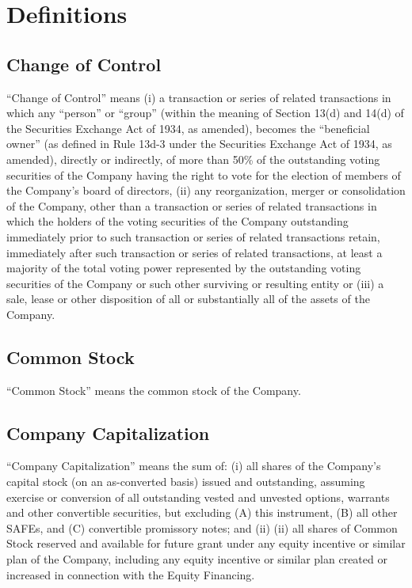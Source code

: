 \documentclass[12pt,letterpaper,fullpage]{article}
\begin{document}
\section{Definitions}
\label{sec:definitions}

\subsection{Change of Control}
\label{sec:changeofcontrol}

\begin{sloppypar}
“Change of Control” means (i) a transaction or series of related
transactions in which any “person” or “group” (within the meaning of
Section 13(d) and 14(d) of the Securities Exchange Act of 1934, as
amended), becomes the “beneficial owner” (as defined in Rule 13d-3
under the Securities Exchange Act of 1934, as amended), directly or
indirectly, of more than 50\% of the outstanding voting securities of
the Company having the right to vote for the election of members of
the Company’s board of directors, (ii) any reorganization, merger or
consolidation of the Company, other than a transaction or series of
related transactions in which the holders of the voting securities of
the Company outstanding immediately prior to such transaction or
series of related transactions retain, immediately after such
transaction or series of related transactions, at least a majority of
the total voting power represented by the outstanding voting
securities of the Company or such other surviving or resulting entity
or (iii) a sale, lease or other disposition of all or substantially
all of the assets of the Company.
\end{sloppypar}

\subsection{Common Stock}
\label{sec:commonstock}

“Common Stock” means the common stock of the Company.

\subsection{Company Capitalization}
\label{sec:companycapitalization}

\begin{sloppypar}
“Company Capitalization” means the sum of: (i) all shares of the
Company’s capital stock (on an as-converted basis) issued and
outstanding, assuming exercise or conversion of all outstanding vested
and unvested options, warrants and other convertible securities, but
excluding (A) this instrument, (B) all other SAFEs, and (C)
convertible promissory notes; and (ii) (ii) all shares of Common Stock
reserved and available for future grant under any equity incentive or
similar plan of the Company, including any equity incentive or similar
plan created or increased in connection with the Equity Financing.
\end{sloppypar}
\end{document}
